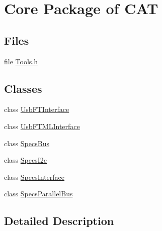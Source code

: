 \hypertarget{group__CATCore}{}\section{Core Package of C\+AT}
\label{group__CATCore}
\subsection*{Files}
\begin{DoxyCompactItemize}
\item 
file \hyperlink{Tools_8h}{Tools.\+h}
\end{DoxyCompactItemize}
\subsection*{Classes}
\begin{DoxyCompactItemize}
\item 
class \hyperlink{classUsbFTInterface}{Usb\+F\+T\+Interface}
\item 
class \hyperlink{classUsbFTMLInterface}{Usb\+F\+T\+M\+L\+Interface}
\item 
class \hyperlink{classSpecsBus}{Specs\+Bus}
\item 
class \hyperlink{classSpecsI2c}{Specs\+I2c}
\item 
class \hyperlink{classSpecsInterface}{Specs\+Interface}
\item 
class \hyperlink{classSpecsParallelBus}{Specs\+Parallel\+Bus}
\end{DoxyCompactItemize}


\subsection{Detailed Description}
